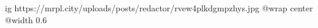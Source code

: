  
 
 
 
 

\ifcmt
  ig https://mrpl.city/uploads/posts/redactor/rvew4plkdgmpzhys.jpg
  @wrap center
  @width 0.6
\fi
